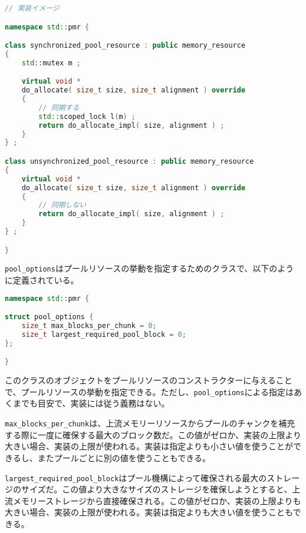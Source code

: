\begin{lstlisting}[language=C++]
// 実装イメージ

namespace std::pmr {

class synchronized_pool_resource : public memory_resource
{
    std::mutex m ;

    virtual void * 
    do_allocate( size_t size, size_t alignment ) override
    {
        // 同期する
        std::scoped_lock l(m) ;
        return do_allocate_impl( size, alignment ) ;
    }
} ;

class unsynchronized_pool_resource : public memory_resource
{
    virtual void * 
    do_allocate( size_t size, size_t alignment ) override
    {
        // 同期しない
        return do_allocate_impl( size, alignment ) ;
    }
} ;

}
\end{lstlisting}

%

\lstinline!pool_options!はプールリソースの挙動を指定するためのクラスで、以下のように定義されている。

\begin{lstlisting}[language=C++]
namespace std::pmr {

struct pool_options {
    size_t max_blocks_per_chunk = 0;
    size_t largest_required_pool_block = 0;
};

}
\end{lstlisting}

このクラスのオブジェクトをプールリソースのコンストラクターに与えることで、プールリソースの挙動を指定できる。ただし、\lstinline!pool_options!による指定はあくまでも目安で、実装には従う義務はない。

\lstinline!max_blocks_per_chunk!は、上流メモリーリソースからプールのチャンクを補充する際に一度に確保する最大のブロック数だ。この値がゼロか、実装の上限より大きい場合、実装の上限が使われる。実装は指定よりも小さい値を使うことができるし、またプールごとに別の値を使うこともできる。

\lstinline!largest_required_pool_block!はプール機構によって確保される最大のストレージのサイズだ。この値より大きなサイズのストレージを確保しようとすると、上流メモリーストレージから直接確保される。この値がゼロか、実装の上限よりも大きい場合、実装の上限が使われる。実装は指定よりも大きい値を使うこともできる。

